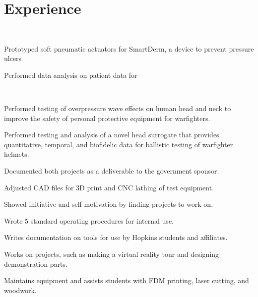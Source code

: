 \documentclass[]{deedy-resume}
\begin{document}
\hfill
\begin{minipage}[t]{0.66\textwidth} 


\section{Experience}
 \\
\vspace{\topsep} %
\begin{tightemize}
\item Prototyped soft pneumatic actuators for SmartDerm, a device to prevent pressure ulcers
\item Performed data analysis on patient data for 
\end{tightemize}
\sectionsep

 \\
\begin{tightemize}
\item Performed testing of overpressure wave effects on human head and neck to improve the safety of personal protective equipment for warfighters.
\item Performed testing and analysis of a novel head surrogate that provides quantitative, temporal, and biofidelic data for ballistic testing of warfighter helmets.
\item Documented both projects as a deliverable to the government sponsor.
\item Adjusted CAD files for 3D print and CNC lathing of test equipment.
\item Showed initiative and self-motivation by finding projects to work on.
\item Wrote 5 standard operating procedures for internal use.
\end{tightemize}
\sectionsep

\begin{tightemize}
\item Writes documentation on tools for use by Hopkins students and affiliates.
\item Works on projects, such as making a virtual reality tour and designing demonstration parts.
\item Maintains equipment and assists students with FDM printing, laser cutting, and woodwork.
\end{tightemize}
\sectionsep


\end{minipage}
\end{document}
